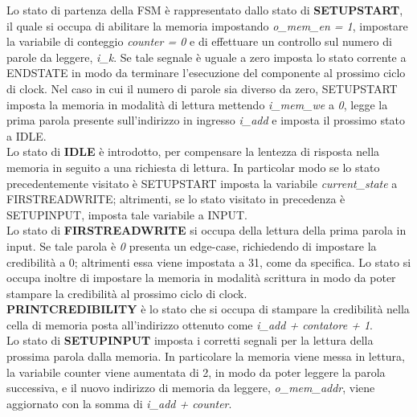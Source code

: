 \documentclass[12pt]{article}
\begin{document}
Lo stato di partenza della FSM è rappresentato dallo stato di \textbf{SETUPSTART}, il quale si occupa di abilitare la memoria impostando \textit{o\_mem\_en = 1}, impostare la variabile di conteggio \textit{counter = 0} e di effettuare un controllo sul numero di parole da leggere, \textit{i\_k}. Se tale segnale è uguale a zero imposta lo stato corrente a ENDSTATE in modo da terminare l'esecuzione del componente al prossimo ciclo di clock. Nel caso in cui il numero di parole sia diverso da zero, SETUPSTART imposta la memoria in modalità di lettura mettendo \textit{i\_mem\_we} a \textit{0}, legge la prima parola presente sull'indirizzo in ingresso \textit{i\_add} e imposta il prossimo stato a IDLE.\\

Lo stato di \textbf{IDLE} è introdotto, per compensare la lentezza di risposta nella memoria in seguito a una richiesta di lettura. In particolar modo se lo stato precedentemente visitato è SETUPSTART imposta la variabile \textit{current\_state} a FIRSTREADWRITE; altrimenti, se lo stato visitato in precedenza è SETUPINPUT, imposta tale variabile a INPUT. \\

Lo stato di \textbf{FIRSTREADWRITE} si occupa della lettura della prima parola in input. Se tale parola è \textit{0} presenta un edge-case, richiedendo di impostare la credibilità a 0; altrimenti essa viene impostata a 31, come da specifica. Lo stato si occupa inoltre di impostare la memoria in modalità scrittura in modo da poter stampare la credibilità al prossimo ciclo di clock.\\

\textbf{PRINTCREDIBILITY} è lo stato che si occupa di stampare la credibilità nella cella di memoria posta all'indirizzo ottenuto come \textit{i\_add + contatore + 1}.\\

Lo stato di \textbf{SETUPINPUT} imposta i corretti segnali per la lettura della prossima parola dalla memoria. In particolare la memoria viene messa in lettura, la variabile counter viene aumentata di 2, in modo da poter leggere la parola successiva, e il nuovo indirizzo di memoria da leggere, \textit{o\_mem\_addr}, viene aggiornato con la somma di \textit{i\_add + counter}.\\
\end{document}
